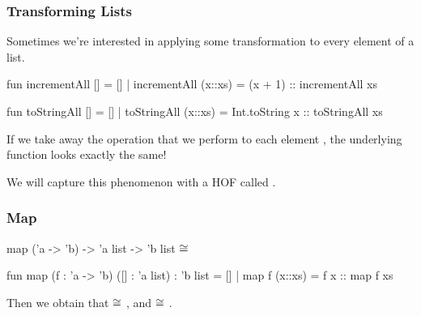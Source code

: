 \documentclass[aspectratio=169, handout]{beamer}
\begin{document}
\begin{frame}[fragile]
  \frametitle{Transforming Lists}

  Sometimes we're interested in applying some transformation to every element of a list.

  \pause
  \vspace{\fill}

  \begin{codeblock}
    fun incrementAll [] = []
      | incrementAll (x::xs) = (x + 1) :: incrementAll xs

    fun toStringAll [] = [] 
      | toStringAll (x::xs) = Int.toString x :: toStringAll xs 
  \end{codeblock}

  \vspace{\fill}
  \pause

  If we take away the operation that we perform to each element , the underlying
  function looks exactly the same! 

  \pause
  \vspace{\fill}

  We will capture this phenomenon with a HOF called .
\end{frame}

\begin{frame}[fragile]
  \frametitle{Map}

  \spec
    {map}
    {('a -> 'b) -> 'a list -> 'b list}
    {}
    { $\cong$ \code{[f x1, ..., f xn]}}

  \pause
  \vspace{\fill}

  \begin{codeblock}
    fun map (f : 'a -> 'b) ([] : 'a list) : 'b list = []
      | map f (x::xs) = f x :: map f xs
  \end{codeblock}

  \pause
  \vspace{\fill}

  Then we obtain that  $\cong$ , 
  and  $\cong$ .
\end{frame}
\end{document}
